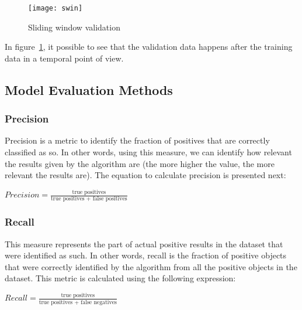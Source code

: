 \begin{figure}[!h] \begin{center} \leavevmode
\texttt{[image: swin]} \caption{Sliding window validation}
\label{fig:swin} \end{center} \end{figure} \FloatBarrier

In figure~\ref{fig:swin}, it possible to see that the validation data happens
after the training data in a temporal point of view.

\subsection{Model Evaluation Methods}

\subsubsection{Precision}

Precision is a metric to identify the fraction of positives that are correctly
classified as so. In other words, using this measure, we can identify how
relevant the results given by the algorithm are (the more higher the value, the
more relevant the results are). The equation to calculate precision is presented
next:

\begin{center} \Large \begin{math} Precision = \frac{\text{true
positives}}{\text{true positives + false positives}} \end{math} \normalsize
\end{center}


\subsubsection{Recall}

This measure represents the part of actual positive results in the dataset that
were identified as such. In other words, recall is the fraction of positive
objects that were correctly identified by the algorithm from all the positive
objects in the dataset. This metric is calculated using the following
expression:

\begin{center} \Large \begin{math} Recall = \frac{\text{true
positives}}{\text{true positives + false negatives}} \end{math} \normalsize
\end{center}

